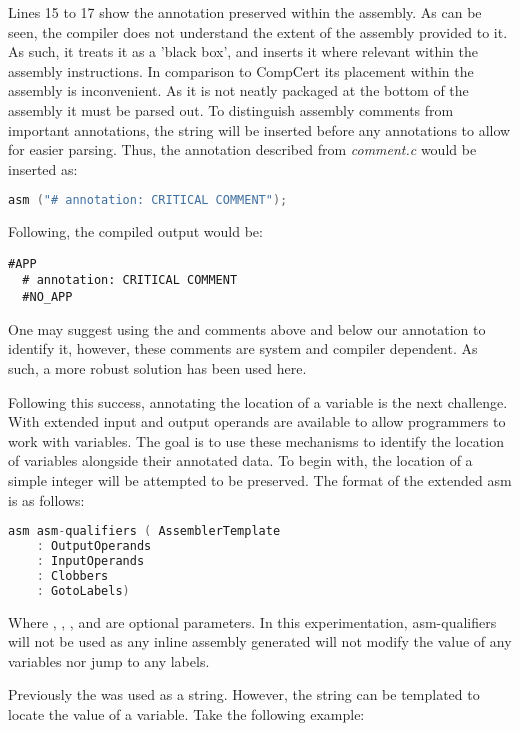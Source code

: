 Lines 15 to 17 show the annotation preserved within the assembly. As can be seen, the compiler does not understand the extent of the assembly provided to it. As such, it treats it as a 'black box', and inserts it where relevant within the assembly instructions. In comparison to CompCert its placement within the assembly is inconvenient. As it is not neatly packaged at the bottom of the assembly it must be parsed out. To distinguish assembly comments from important annotations, the string  will be inserted before any annotations to allow for easier parsing. Thus, the annotation described from \textit{comment.c} would be inserted as:

\begin{lstlisting}[firstnumber=2, language=C]
    asm ("# annotation: CRITICAL COMMENT");
\end{lstlisting}

Following, the compiled output would be:
\begin{lstlisting}[firstnumber=15]
  #APP
  # annotation: CRITICAL COMMENT
  #NO_APP
\end{lstlisting}

One may suggest using the  and  comments above and below our annotation to identify it, however, these comments are system and compiler dependent. As such, a more robust solution has been used here.

Following this success, annotating the location of a variable is the next challenge. With extended  input and output operands are available to allow programmers to work with variables. The goal is to use these mechanisms to identify the location of variables alongside their annotated data. To begin with, the location of a simple integer will be attempted to be preserved. The format of the extended asm is as follows:

\begin{lstlisting}[language=C, numbers=none]
asm asm-qualifiers ( AssemblerTemplate 
    : OutputOperands
    : InputOperands
    : Clobbers
    : GotoLabels)
\end{lstlisting}

Where , , ,  and  are optional parameters. In this experimentation, asm-qualifiers will not be used as any inline assembly generated will not modify the value of any variables nor jump to any labels.

Previously the  was used as a string. However, the string can be templated to locate the value of a variable. Take the following example:

